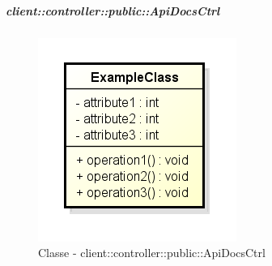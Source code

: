 		\subparagraph{client::controller::public::ApiDocsCtrl} %
		\label{subp:bdsm_app_client_controller_public_apidocsctrl}
			\begin{figure}[htbp]
				\centering
				\centerline{\includegraphics[scale=0.7]{./images/client/classes/example_class.png}}
				\caption{Classe - client::controller::public::ApiDocsCtrl}
			\end{figure}
